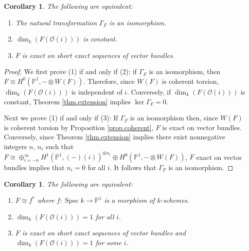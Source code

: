 \documentclass[10pt]{amsart}
\newtheorem{cor}[lemma]{Corollary}
\theoremstyle{definition}
\theoremstyle{remark}
\numberwithin{equation}{section}
\begin{document}
\begin{cor} \label{cor.vectorbundles}
The following are equivalent:

\begin{enumerate}

\item The natural transformation $\Gamma_{F}$ is an isomorphism.

\item $\operatorname{dim}_{k}(F(\mathcal{O}(i)))$ is constant.

\item $F$ is exact on short exact sequences of vector bundles.

\end{enumerate}
\end{cor}

\begin{proof}
We first prove (1) if and only if (2):  if $\Gamma_{F}$ is an isomorphism, then $F \cong H^{0}(\mathbb{P}^{1},-\otimes W(F))$.  Therefore, since $W(F)$ is coherent torsion, $\operatorname{dim}_{k}(F(\mathcal{O}(i)))$ is independent of $i$. Conversely, if $\operatorname{dim}_{k}(F(\mathcal{O}(i)))$ is constant, Theorem \ref{thm.extension} implies ${\operatorname{ker }\Gamma_{F}} =0$.

Next we prove (1) if and only if (3):  If $\Gamma_{F}$ is an isomorphism then, since $W(F)$ is coherent torsion by Proposition \ref{prop.coherent}, $F$ is exact on vector bundles.  Conversely, since Theorem \ref{thm.extension} implies there exist nonnegative integers $n$, $n_{i}$ such that $F \cong \oplus_{i=-n}^\infty {H}^{1}(\mathbb{P}^{1},(-)(i))^{\oplus n_{i}} \oplus H^{0}(\mathbb{P}^{1},-\otimes W(F))$, $F$ exact on vector bundles implies that $n_{i}=0$ for all $i$.  It follows that $\Gamma_{F}$ is an isomorphism.
\end{proof}

\begin{cor} \label{cor.morphism}
The following are equivalent:
\begin{enumerate}
\item $F \cong f^{*}$ where $f:\operatorname{Spec }k \rightarrow \mathbb{P}^{1}$ is a morphism of $k$-schemes.

\item  $\operatorname{dim}_{k}(F(\mathcal{O}(i)))=1$ for all $i$.

\item $F$ is exact on short exact sequences of vector bundles and $\operatorname{dim}_{k}(F(\mathcal{O}(i)))=1$ for some $i$.
\end{enumerate}
\end{cor}
\end{document}
